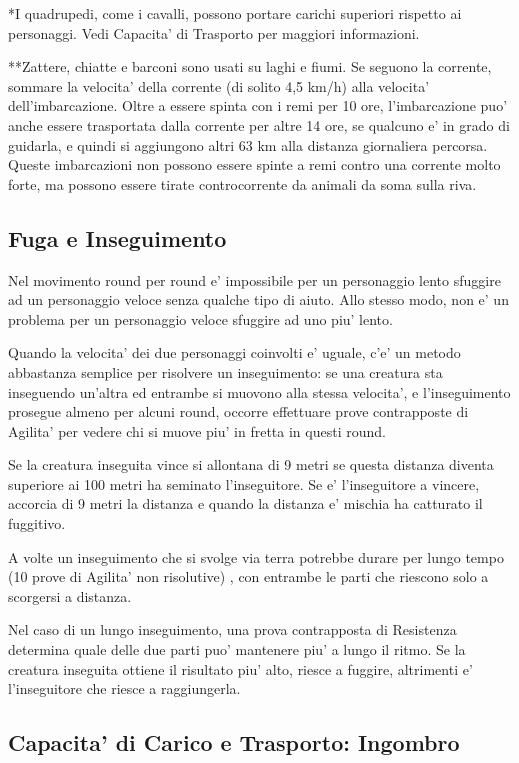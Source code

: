 \documentclass[a4paper,11pt,twoside,openany]{book}
\begin{document}
{		*I quadrupedi, come i cavalli, possono portare carichi superiori rispetto ai personaggi. Vedi Capacita' di Trasporto per maggiori informazioni.
		
		**Zattere, chiatte e barconi sono usati su laghi e fiumi. Se seguono la corrente, sommare la velocita' della corrente (di solito 4,5 km/h) alla velocita' dell'imbarcazione. Oltre a essere spinta con i remi per 10 ore, l'imbarcazione puo' anche essere trasportata dalla corrente per altre 14 ore, se qualcuno e' in grado di guidarla, e quindi si aggiungono altri 63 km alla distanza giornaliera percorsa. Queste imbarcazioni non possono essere spinte a remi contro una corrente molto forte, ma possono essere tirate controcorrente da animali da soma sulla riva.
		
		\subsection{Fuga e Inseguimento}
		
		Nel movimento round per round e' impossibile per un personaggio lento sfuggire ad un personaggio veloce senza qualche tipo di aiuto. Allo stesso modo, non e' un problema per un personaggio veloce sfuggire ad uno piu' lento.
		
		Quando la velocita' dei due personaggi coinvolti e' uguale, c'e' un metodo abbastanza semplice per risolvere un inseguimento: se una creatura sta inseguendo un'altra ed entrambe si muovono alla stessa velocita', e l'inseguimento prosegue almeno per alcuni round, occorre effettuare prove contrapposte di Agilita' per vedere chi si muove piu' in fretta in questi round.
		
		Se la creatura inseguita vince si allontana di 9 metri se questa distanza diventa superiore ai 100 metri ha seminato l'inseguitore. Se e' l'inseguitore a vincere, accorcia di 9 metri la distanza e quando la distanza e' mischia ha catturato il fuggitivo.
		
		A volte un inseguimento che si svolge via terra potrebbe durare per lungo tempo (10 prove di Agilita' non risolutive) , con entrambe le parti che riescono solo a scorgersi a distanza.
		
		Nel caso di un lungo inseguimento, una prova contrapposta di Resistenza determina quale delle due parti puo' mantenere piu' a lungo il ritmo. Se la creatura inseguita ottiene il risultato piu' alto, riesce a fuggire, altrimenti e' l'inseguitore che riesce a raggiungerla.
		
		\subsection{Capacita' di Carico e Trasporto: Ingombro}
		
}
\end{document}
